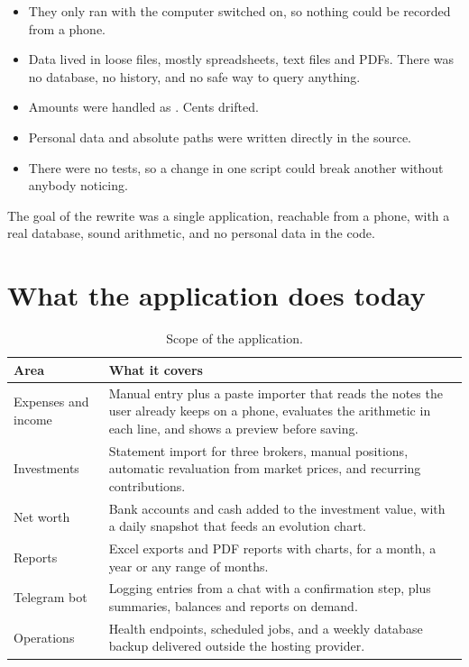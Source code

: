 \begin{itemize}
  \item They only ran with the computer switched on, so nothing could be
        recorded from a phone.
  \item Data lived in loose files, mostly spreadsheets, text files and PDFs.
        There was no database, no history, and no safe way to query anything.
  \item Amounts were handled as . Cents drifted.
  \item Personal data and absolute paths were written directly in the source.
  \item There were no tests, so a change in one script could break another
        without anybody noticing.
\end{itemize}

The goal of the rewrite was a single application, reachable from a phone, with a
real database, sound arithmetic, and no personal data in the code.

\section{What the application does today}

\begin{table}[h]
\centering
\begin{tabular}{@{}p{4.1cm}p{9.6cm}@{}}
\toprule
\textbf{Area} & \textbf{What it covers} \\
\midrule
Expenses and income & Manual entry plus a paste importer that reads the notes
the user already keeps on a phone, evaluates the arithmetic in each line, and
shows a preview before saving. \\
Investments & Statement import for three brokers, manual positions, automatic
revaluation from market prices, and recurring contributions. \\
Net worth & Bank accounts and cash added to the investment value, with a daily
snapshot that feeds an evolution chart. \\
Reports & Excel exports and PDF reports with charts, for a month, a year or any
range of months. \\
Telegram bot & Logging entries from a chat with a confirmation step, plus
summaries, balances and reports on demand. \\
Operations & Health endpoints, scheduled jobs, and a weekly database backup
delivered outside the hosting provider. \\
\bottomrule
\end{tabular}
\caption{Scope of the application.}
\end{table}

